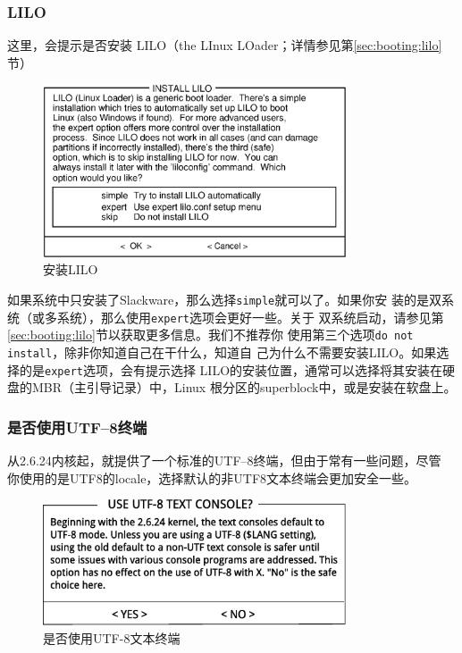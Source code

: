 \subsubsection{LILO}
\label{sec:installation:setup:configure:lilo}这里，会提示是否安装
LILO（the LInux LOader；详情参见第\ref{sec:booting:lilo}节）
\begin{figure}[htpb]
  \centering
  \includegraphics[width=0.8\textwidth]{images/installation/setup-lilo.eps}
  \caption{安装LILO}
  \label{fig:set-lilo}
\end{figure}
如果系统中只安装了Slackware，那么选择\texttt{simple}就可以了。如果你安
装的是双系统（或多系统），那么使用\texttt{expert}选项会更好一些。关于
双系统启动，请参见第\ref{sec:booting:lilo}节以获取更多信息。我们不推荐你
使用第三个选项\texttt{do not install}，除非你知道自己在干什么，知道自
己为什么不需要安装LILO。如果选择的是\texttt{expert}选项，会有提示选择
LILO的安装位置，通常可以选择将其安装在硬盘的MBR（主引导记录）中，Linux
根分区的superblock中，或是安装在软盘上。

\subsubsection{是否使用UTF--8终端}
\label{sec:installation:setup:configure:utf8console}
从2.6.24内核起，就提供了一个标准的UTF--8终端，但由于常有一些问题，尽管
你使用的是UTF8的locale，选择默认的非UTF8文本终端会更加安全一些。
\begin{figure}[htpb]
  \centering
  \includegraphics[width=0.8\textwidth]{images/installation/use-utf8-text-console.eps}
  \caption{是否使用UTF-8文本终端}
  \label{fig:use-utf8-text-console}
\end{figure}

